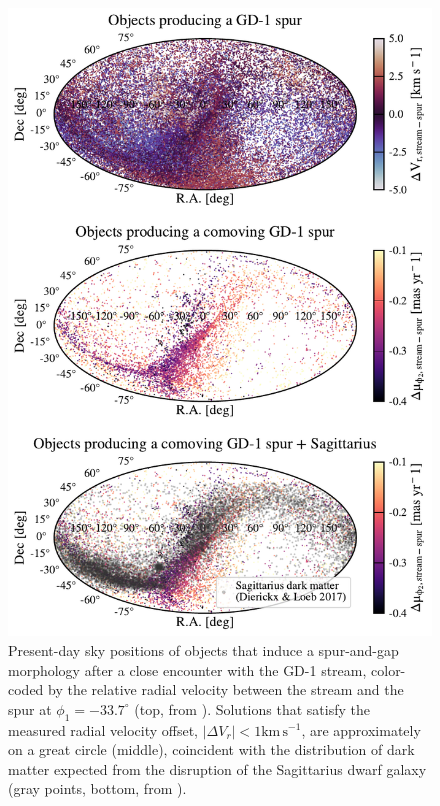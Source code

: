 \documentclass[twocolumn]{aastex63}
\newcommand{\kms}{\ensuremath{\textrm{km}\,\textrm{s}^{-1}}}
\begin{document}
\begin{figure}
\begin{center}
\includegraphics[width=0.99\columnwidth]{skybox.pdf}
\end{center}
\caption{Present-day sky positions of objects that induce a spur-and-gap morphology after a close encounter with the GD-1 stream, color-coded by the relative radial velocity between the stream and the spur at $\phi_1=-33.7^\circ$ (top, from \citealt{bonaca2019a}).
Solutions that satisfy the measured radial velocity offset, $|\Delta V_r|<1\kms$, are approximately on a great circle (middle), coincident with the distribution of dark matter expected from the disruption of the Sagittarius dwarf galaxy (gray points, bottom, from \citealt{dl2017}).
}
\label{fig:skybox}
\end{figure}
\end{document}
